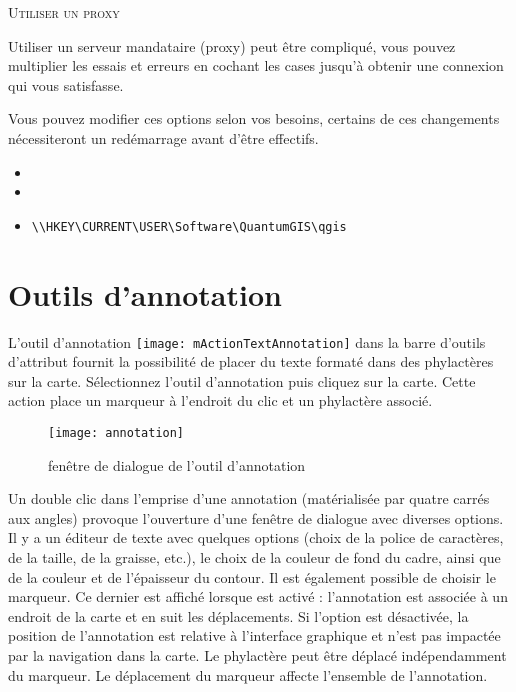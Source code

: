 \begin{Tip} \caption{\textsc{Utiliser un proxy}}
Utiliser un serveur mandataire (proxy) peut être compliqué, vous pouvez multiplier les essais et erreurs en cochant les cases jusqu'à obtenir une connexion qui vous satisfasse.
\end{Tip}

Vous pouvez modifier ces options selon vos besoins, certains de ces changements nécessiteront un redémarrage avant d'être effectifs.

\begin{itemize}[label=--]
\item {}
\item {}
\item {}
\begin{verbatim}
\\HKEY\CURRENT\USER\Software\QuantumGIS\qgis
\end{verbatim}
\end{itemize}

\section{Outils d'annotation} \label{sec:annotations}

L'outil d'annotation \texttt{[image: mActionTextAnnotation]} dans la barre d'outils d'attribut fournit la possibilité de placer du texte formaté dans des phylactères sur la carte. Sélectionnez l'outil d'annotation puis cliquez sur la carte. Cette action place un marqueur à l'endroit du clic et un phylactère associé.

\begin{figure}[ht]
   \centering
   \texttt{[image: annotation]}
   \caption{fenêtre de dialogue de l'outil d'annotation \nixcaption}
   \label{fig:annotation}
\end{figure}

Un double clic dans l'emprise d'une annotation (matérialisée par quatre carrés aux angles) provoque l'ouverture d'une fenêtre de dialogue avec diverses options. Il y a un éditeur de texte avec quelques options (choix de la police de caractères, de la taille, de la graisse, etc.), le choix de la couleur de fond du cadre, ainsi que de la couleur et de l'épaisseur du contour. Il est également possible de choisir le marqueur. Ce dernier est affiché lorsque  est activé : l'annotation est associée à un endroit de la carte et en suit les déplacements. Si l'option est désactivée, la position de l'annotation est relative à l'interface graphique et n'est pas impactée par la navigation dans la carte. Le phylactère peut être déplacé indépendamment du marqueur. Le déplacement du marqueur affecte l'ensemble de l'annotation.

